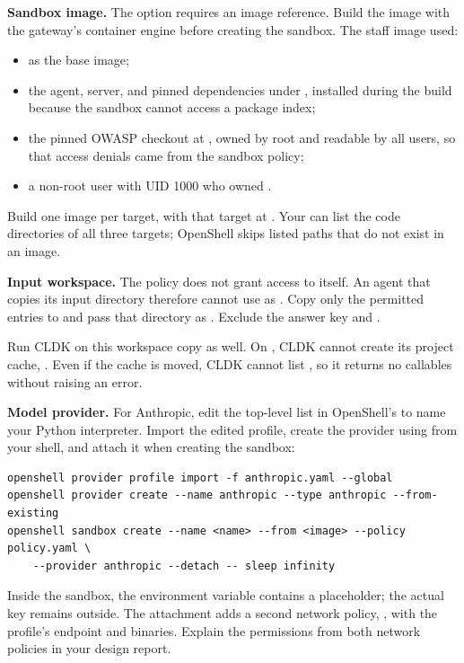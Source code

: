 \documentclass[9pt,letterpaper]{article}
\begin{document}
\textbf{Sandbox image.} The  option requires an
image reference. Build the image with the gateway's container engine before
creating the sandbox. The staff image used:
\begin{itemize}
\item {} as the base image;
\item the agent, server, and pinned dependencies under , installed
  during the build because the sandbox cannot access a package index;
\item the pinned OWASP checkout at , owned by root and readable
  by all users, so that access denials came from the sandbox policy;
\item a non-root user with UID 1000 who owned .
\end{itemize}
Build one image per target, with that target at . Your
 can list the code directories of all three targets; OpenShell
skips listed paths that do not exist in an image.

\textbf{Input workspace.} The policy does not grant access to 
itself. An agent that copies its input directory therefore cannot use
 as . Copy only the permitted entries to
 and pass that directory as . Exclude
the answer key and .

Run CLDK on this workspace copy as well. On , CLDK cannot create
its project cache, . Even if the cache is moved, CLDK cannot
list , so it returns no callables without raising an error.

\textbf{Model provider.} For Anthropic, edit the top-level  list in
OpenShell's  to name your Python interpreter.
Import the edited profile, create the provider using 
from your shell, and attach it when creating the sandbox:
\begin{verbatim}
openshell provider profile import -f anthropic.yaml --global
openshell provider create --name anthropic --type anthropic --from-existing
openshell sandbox create --name <name> --from <image> --policy policy.yaml \
    --provider anthropic --detach -- sleep infinity
\end{verbatim}
Inside the sandbox, the environment variable contains a placeholder; the actual
key remains outside. The attachment adds a second network policy,
\code{_provider_anthropic}, with the profile's endpoint and binaries. Explain
the permissions from both network policies in your design report.
\end{document}
